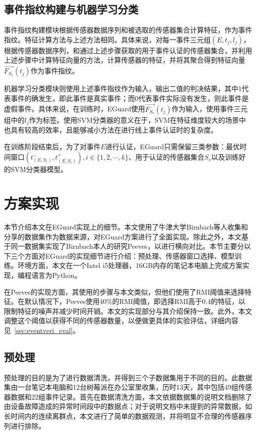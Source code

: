 \subsection{事件指纹构建与机器学习分类}

事件指纹构建模块根据传感器数据序列和被选取的传感器集合计算特征，作为事件指纹。特征计算方法与上述方法相同。具体来说，对每一事件三元组$(E,t_j,l_j)$，根据传感器数据序列，和通过上述步骤获取的用于事件认证的传感器集合，并利用上述步骤中计算特征向量的方法，计算传感器的特征，并将其聚合得到特征向量$\vec{F_{S_v}}(t_j) $作为事件指纹。

机器学习分类模块则使用上述事件指纹作为输入，输出二值的判决结果，其中1代表事件的确发生，即此事件是真实事件；而0代表事件实际没有发生，则此事件是虚假事件。具体来说，在训练时，EGuard使用$\vec{F_{S_v}}(t_j) $作为输入，使用事件三元组中的$l_j$作为标签。使用SVM分类器的意义在于，SVM在特征维度较大的场景中也具有较高的效率，且能够减小方法在进行线上事件认证时的复杂度。

在训练阶段结束后，为了对事件$E$进行认证，EGuard只需保留三类参数：最优时间窗口$(t_(E,S_i)^-,t_(E,S_i)^+ ),i\in \{1,2,\cdots,k\}$、用于认证的传感器集合$S_v$以及训练好的SVM分类器模型。

\section{方案实现}

本节介绍本文在EGuard实现上的细节。本文使用了牛津大学Birnbach等人收集和分享的数据集作为数据来源，对EGuard方案进行了全面实现。除此之外，本文基于同一数据集实现了Birnbach本人的研究Peeves，以进行横向对比。本节主要分以下三个方面对EGuard的实现细节进行介绍：预处理、传感器窗口选择、模型训练。环境方面，本文在一个Intel i5处理器，16GB内存的笔记本电脑上完成方案实现，编程语言为Python。

在Peeves的实现方面，其使用的步骤与本文类似，但他们使用了RMI阈值来选择特征。在默认情况下，Peeves使用40\%的RMI阈值，即选择RMI高于0.4的特征，以限制特征的噪声并减少时间开销。本文的实现部分与其介绍保持一致。此外，本文调整这个阈值以获得不同的传感器数量，以便做更具体的实验评估，详细内容见~\ref{sec:eventveri_eval}。

\subsection{预处理}

预处理的目的是为了进行数据清洗，并得到三个子数据集用于不同的目的。此数据集由一台笔记本电脑和12台树莓派在办公室里收集，历时13天，其中包括49组传感器数据和22组事件记录。首先在数据清洗方面，本文依据数据集的说明文档删除了由设备故障造成的异常时间段中的数据点；对于说明文档中未提到的异常数据，如长时间内的连续离群点，本文进行了简单的数据观测，并将明显不合理的传感器序列进行排除。

